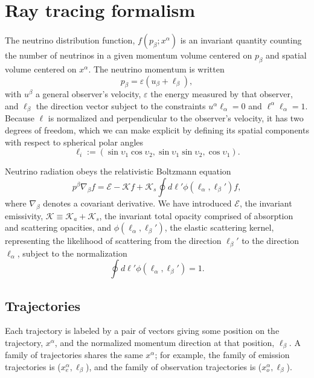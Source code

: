 \documentclass[aps,prd,twocolumn,superscriptaddress,groupedaddress]{revtex4}
\newcommand{\todo}[1]{\marginpar{\tiny{\textcolor{red}{#1}}}}
\begin{document}
\section{Ray tracing formalism}

The neutrino distribution function, $f(p_\beta; x^\alpha)$ is an invariant
quantity counting the number of neutrinos in a given momentum volume centered on
$p_\beta$ and spatial volume centered on $x^\alpha$.
The neutrino momentum is written
\begin{equation}
  \label{eqn:def_momentum}
  p_\beta = \varepsilon (u_\beta + \ell_\beta),
\end{equation}
with $u^\beta$ a general observer's velocity,
$\varepsilon$ the energy measured by that observer,
and $\ell_\beta$ the direction vector subject to the constraints
$u^\alpha \ell_\alpha = 0$ and
$\ell^\alpha \ell_\alpha=1$.
Because $\ell$ is normalized and perpendicular to the observer's velocity,
it has two degrees of freedom, which we can make explicit by defining its
spatial components with respect to spherical polar angles
\begin{equation}
  \label{eq:def_direction}
  \ell_i :=
  (\sin\upsilon_1\cos\upsilon_2,\sin\upsilon_1\sin\upsilon_2,\cos\upsilon_1).
\end{equation}

Neutrino radiation obeys the relativistic Boltzmann equation
\todo{integral isn't explicitly covariant}
\begin{equation}
  \label{eqn:boltzmann}
  p^\beta \nabla_\beta f = \mathscr{E} - \mathscr{K} f
  + \mathscr{K}_s \oint d\ell' \phi(\ell_\alpha,\ell_\beta') f,
\end{equation}
where $\nabla_\beta$ denotes a covariant derivative. We have introduced
$\mathscr{E}$, the invariant emissivity,
$\mathscr{K}\equiv\mathscr{K}_a+\mathscr{K}_s$, the invariant total opacity
comprised of absorption and scattering opacities, and
$\phi(\ell_\alpha,\ell_\beta')$, the elastic scattering kernel, representing the
likelihood of scattering from the direction $\ell_\beta'$ to the direction
$\ell_\alpha$, subject to the normalization
\todo{confirm this}
\begin{equation}
  \oint d\ell' \phi(\ell_\alpha,\ell_\beta') = 1.
  \nonumber
\end{equation}

\subsection{Trajectories}
\label{ssc:trajectories}
Each trajectory is labeled by a pair of vectors
giving some position on the trajectory, $x^\alpha$,
and the normalized momentum direction at that position,
$\ell_\beta$.
A family of trajectories shares the same $x^\alpha$; for example,
the family of emission trajectories is ($x^\alpha_e,\ell_\beta$),
and the family of observation trajectories is ($x^\alpha_o,\ell_\beta$).
\end{document}
